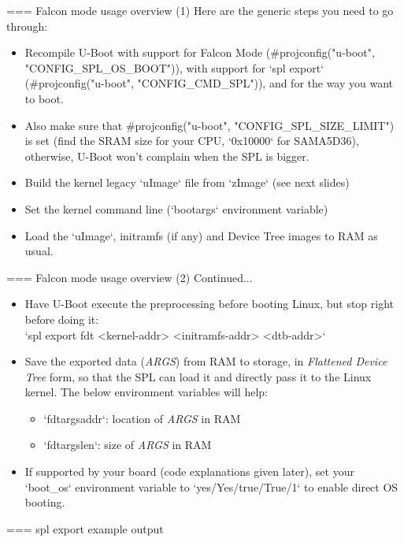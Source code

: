 === {Falcon mode usage overview (1)}
   Here are the generic steps you need to go through:
   \begin{itemize}
     \item Recompile U-Boot with support for Falcon Mode
           (#projconfig("u-boot", "CONFIG_SPL_OS_BOOT")), with support
	   for `spl export` (#projconfig("u-boot", "CONFIG_CMD_SPL")),
	   and for the way you want to boot.
     \item Also make sure that #projconfig("u-boot", "CONFIG_SPL_SIZE_LIMIT") is
	   set (find the SRAM size for your CPU, `0x10000` for
           SAMA5D36), otherwise, U-Boot won't complain when the SPL
	   is bigger.
     \item Build the kernel legacy `uImage` file from `zImage`
	   (see next slides)
     \item Set the kernel command line (`bootargs` environment variable)
     \item Load the `uImage`, initramfs (if any) and Device Tree images
	   to RAM as usual.
   \end{itemize}


=== {Falcon mode usage overview (2)}
   Continued...
   \begin{itemize}
     \item Have U-Boot execute the preprocessing before booting Linux,
           but stop right before doing it:\\
	   `spl export fdt <kernel-addr> <initramfs-addr> <dtb-addr>`
     \item Save the exported data ({\em ARGS}) from RAM to storage, in {\em Flattened Device
	   Tree} form, so that the SPL can load it and directly pass it to
           the Linux kernel. The below environment variables will help:
	   \begin{itemize}
		\item `fdtargsaddr`: location of {\em ARGS} in RAM
		\item `fdtargslen`: size of {\em ARGS} in RAM
	   \end{itemize}
     \item If supported by your board (code explanations given later),
	   set your `boot_os` environment variable to `yes/Yes/true/True/1`
           to enable direct OS booting.
   \end{itemize}


=== spl export example output
  
